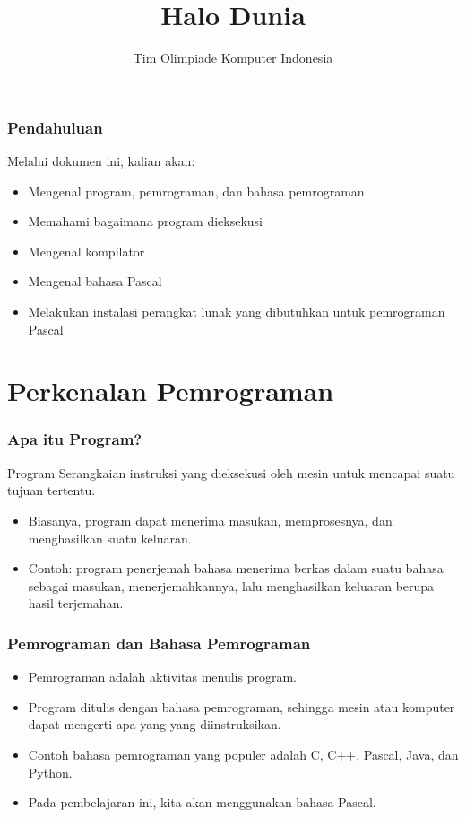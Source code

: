 

\title{Halo Dunia}
\author{Tim Olimpiade Komputer Indonesia}
\date{}



\begin{frame}
\titlepage
\end{frame}

\begin{frame}
\frametitle{Pendahuluan}
Melalui dokumen ini, kalian akan:
\begin{itemize}
  \item Mengenal program, pemrograman, dan bahasa pemrograman
  \item Memahami bagaimana program dieksekusi
  \item Mengenal kompilator
  \item Mengenal bahasa Pascal
  \item Melakukan instalasi perangkat lunak yang dibutuhkan untuk pemrograman Pascal
\end{itemize}
\end{frame}

\section{Perkenalan Pemrograman}
\frame{\sectionpage}

\begin{frame}
\frametitle{Apa itu Program?}
\begin{block}{Program}
  Serangkaian instruksi yang dieksekusi oleh mesin untuk mencapai suatu tujuan tertentu.
\end{block}
\begin{itemize}
  \item Biasanya, program dapat menerima masukan, memprosesnya, dan menghasilkan suatu keluaran.
  \item Contoh: program penerjemah bahasa menerima berkas dalam suatu bahasa sebagai masukan, menerjemahkannya, lalu menghasilkan keluaran berupa hasil terjemahan.
\end{itemize}
\end{frame}

\begin{frame}
\frametitle{Pemrograman dan Bahasa Pemrograman}
\begin{itemize}
  \item Pemrograman adalah aktivitas menulis program.
  \item Program ditulis dengan bahasa pemrograman, sehingga mesin atau komputer dapat mengerti apa yang yang diinstruksikan.
  \item Contoh bahasa pemrograman yang populer adalah C, C++, Pascal, Java, dan Python.
  \item Pada pembelajaran ini, kita akan menggunakan bahasa Pascal.
\end{itemize}
\end{frame}

